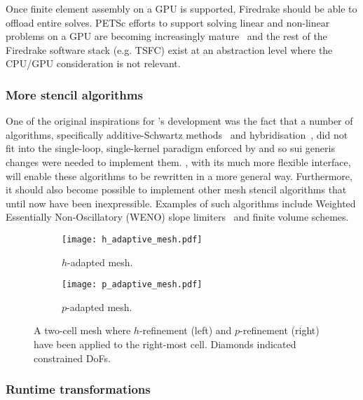 \documentclass[thesis]{subfiles}
\begin{document}
Once finite element assembly on a GPU is supported, Firedrake should be able to offload entire solves.
PETSc efforts to support solving linear and non-linear problems on a GPU are becoming increasingly mature~\cite{millsPerformancePortablePETScGPUbased2020,millsPETScTAODevelopments2024}
and the rest of the Firedrake software stack (e.g. TSFC) exist at an abstraction level where the CPU/GPU consideration is not relevant.

\subsubsection{More stencil algorithms}
\label{sec:more_stencils}

One of the original inspirations for 's development was the fact that a number of algorithms, specifically additive-Schwartz methods~\cite{farrellPCPATCHSoftwareTopological2021} and hybridisation~\cite{gibsonSlateExtendingFiredrake2020}, did not fit into the single-loop, single-kernel paradigm enforced by  and so sui generis changes were needed to implement them.
, with its much more flexible interface, will enable these algorithms to be rewritten in a more general way.
Furthermore, it should also become possible to implement other mesh stencil algorithms that until now have been inexpressible.
Examples of such algorithms include Weighted Essentially Non-Oscillatory (WENO) slope limiters~\cite{liuWeightedEssentiallyNonoscillatory1994} and finite volume schemes.

\begin{figure}
  \centering
  \begin{subfigure}{.49\textwidth}
    \centering
    \texttt{[image: h\_adaptive\_mesh.pdf]}
    \caption{$h$-adapted mesh.}
    \label{fig:h_adaptive_mesh}
  \end{subfigure}
  \begin{subfigure}{.49\textwidth}
    \centering
    \texttt{[image: p\_adaptive\_mesh.pdf]}
    \caption{$p$-adapted mesh.}
  \end{subfigure}

  \caption{
    A two-cell mesh where $h$-refinement (left) and $p$-refinement (right) have been applied to the right-most cell.
    Diamonds indicated constrained DoFs.
  }
  \label{fig:adaptive_mesh}
\end{figure}

\subsubsection{Runtime transformations}
\end{document}
